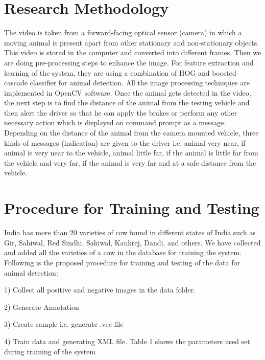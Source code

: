 \documentclass[14pt,a4paper,final]{extreport}
\begin{document}
\chapter{Research Methodology}
\item The video is taken from a forward-facing optical sensor (camera) in which a moving animal is present apart from other stationary and non-stationary objects. This video is stored in the computer and converted into different frames. Then we are doing pre-processing steps to enhance the image. For feature extraction and learning of the system, they are using a combination of HOG and boosted cascade classifier for animal detection. All the image processing techniques are implemented in OpenCV software. Once the animal gets detected in the video, the next step is to find the distance of the animal from the testing vehicle and then alert the driver so that he can apply the brakes or perform any other necessary action which is displayed on command prompt as a message. Depending on the distance of the animal from the camera mounted vehicle, three kinds of messages (indication) are given to the driver i.e. animal very near, if animal is very near to the vehicle, animal little far, if the animal is little far from the vehicle and very far, if the animal is very far and at a safe distance from the vehicle.

\newline
\newline
\chapter{Procedure for Training and Testing}
\item India has more than 20 varieties of cow found in different states of India such as Gir, Sahiwal, Red Sindhi, Sahiwal, Kankrej, Dandi, and others. We have collected and added all the varieties of a cow in the database for training the system. Following is the proposed procedure for training and testing of the data for animal detection:

\item 1) Collect all positive and negative images in the data folder.

\item 2) Generate Annotation

\item 3) Create sample i.e. generate .vec file

\item 4) Train data and generating XML file. Table 1 shows the parameters used set during training of the system
\end{document}
